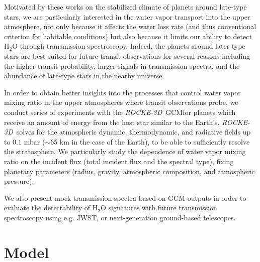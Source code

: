 \documentclass[11pt,numberedappendix,twocolappendix,]{emulateapj}
\def\water{H$_2$O }
\def\modelE{{\it ROCKE-3D}}
\def\memo#1{\color{red}$[${\bf #1}$]$ \color{black}}
\begin{document}
Motivated by these works on the stabilized climate of planets around late-type stars, we are particularly interested in the water vapor transport  into the upper atmosphere, not only because it affects the water loss rate (and thus conventional criterion for habitable conditions) but also because it limits our ability to detect \water through transmission spectroscopy. 
%
Indeed, the planets around later type stars are best suited for future transit observations for several reasons including the higher transit probability, larger signals in transmission spectra, and the abundance of late-type stars in the nearby universe. 


In order to obtain better insights into the processes that control water vapor mixing ratio in the upper atmospheres where transit observations probe, we conduct series of experiments with the \modelE \ GCMfor planets which receive an amount of energy from the host star similar to the Earth's. 
\modelE \ solves for the atmospheric dynamic, thermodynamic, and radiative fields up to $0.1$ mbar ($\sim $65 km in the case of the Earth), to be able to sufficiently resolve the stratosphere. 
We particularly study the dependence of water vapor mixing ratio on the incident flux (total incident flux and the spectral type), fixing planetary parameters (radius, gravity, atmospheric composition, and atmospheric pressure). 

We also present mock transmission spectra based on GCM outputs in order to evaluate the detectability of \water signatures with future transmission spectroscopy using e.g. JWST, or next-generation ground-based telescopes. 




\section{Model}
\label{s:model}
\end{document}
